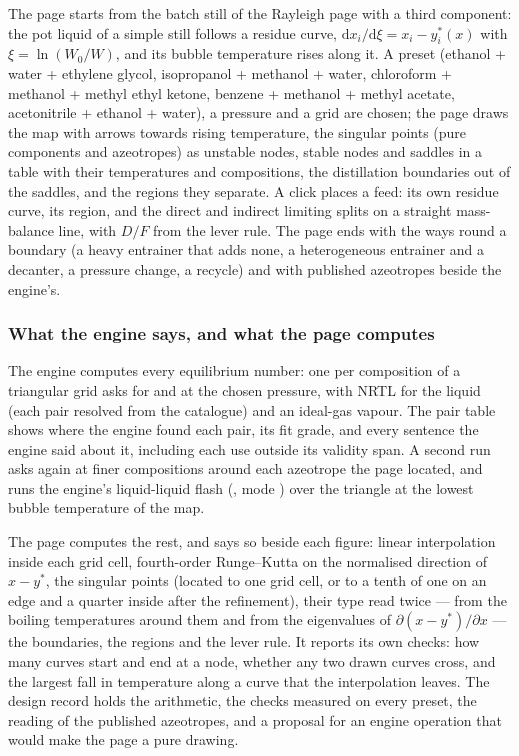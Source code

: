 \documentclass[11pt,a4paper]{article}
\begin{document}
The page starts from the batch still of the Rayleigh page with a third
component: the pot liquid of a simple still follows a residue curve,
$\mathrm{d}x_i/\mathrm{d}\xi = x_i - y_i^{*}(x)$ with $\xi=\ln(W_0/W)$, and its
bubble temperature rises along it.  A preset (ethanol + water + ethylene glycol,
isopropanol + methanol + water, chloroform + methanol + methyl ethyl ketone,
benzene + methanol + methyl acetate, acetonitrile + ethanol + water), a pressure
and a grid are chosen; the page draws the map with arrows towards rising
temperature, the singular points (pure components and azeotropes) as unstable
nodes, stable nodes and saddles in a table with their temperatures and
compositions, the distillation boundaries out of the saddles, and the regions
they separate.  A click places a feed: its own residue curve, its region, and
the direct and indirect limiting splits on a straight mass-balance line, with
$D/F$ from the lever rule.  The page ends with the ways round a boundary (a heavy
entrainer that adds none, a heterogeneous entrainer and a decanter, a pressure
change, a recycle) and with published azeotropes beside the engine's.

\subsubsection*{What the engine says, and what the page computes}

The engine computes every equilibrium number: one  per
composition of a triangular grid asks for  and
 at the chosen pressure, with NRTL for the liquid (each
pair resolved from the catalogue) and an ideal-gas vapour.  The pair table shows
where the engine found each pair, its fit grade, and every sentence the engine
said about it, including each use outside its validity span.  A second run asks
again at finer compositions around each azeotrope the page located, and runs the
engine's liquid-liquid flash (, mode ) over
the triangle at the lowest bubble temperature of the map.

The page computes the rest, and says so beside each figure: linear interpolation
inside each grid cell, fourth-order Runge--Kutta on the normalised direction of
$x-y^{*}$, the singular points (located to one grid cell, or to a tenth of
one on an edge and a quarter inside after the refinement), their type read twice --- from the boiling
temperatures around them and from the eigenvalues of
$\partial(x-y^{*})/\partial x$ --- the boundaries, the regions and the lever
rule.  It reports its own checks: how many curves start and end at a node,
whether any two drawn curves cross, and the largest fall in temperature along a
curve that the interpolation leaves.  The design record
 holds the arithmetic, the checks
measured on every preset, the reading of the published azeotropes, and a
proposal for an engine operation that would make the page a pure drawing.
\end{document}
